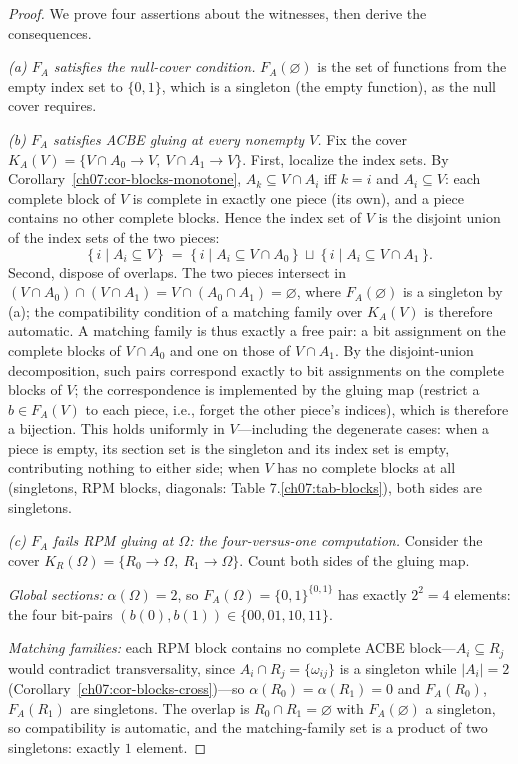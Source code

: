 \begin{proof}
We prove four assertions about the witnesses, then derive the consequences.

\emph{(a) $F_{A}$ satisfies the null-cover condition.} $F_{A}(\varnothing)$ is the set of functions from the empty index set to $\{0,1\}$, which is a singleton (the empty function), as the null cover requires.

\emph{(b) $F_{A}$ satisfies ACBE gluing at every nonempty $V$.} Fix the cover $K_{A}(V)=\{V\cap A_{0}\to V,\ V\cap A_{1}\to V\}$. First, localize the index sets. By Corollary~\ref{ch07:cor-blocks-monotone}, $A_{k}\subseteq V\cap A_{i}$ iff $k=i$ and $A_{i}\subseteq V$: each complete block of $V$ is complete in exactly one piece (its own), and a piece contains no other complete blocks. Hence the index set of $V$ is the disjoint union of the index sets of the two pieces:
\[
\{\,i\mid A_{i}\subseteq V\,\}\;=\;\{\,i\mid A_{i}\subseteq V\cap A_{0}\,\}\ \sqcup\ \{\,i\mid A_{i}\subseteq V\cap A_{1}\,\}.
\]
Second, dispose of overlaps. The two pieces intersect in $(V\cap A_{0})\cap(V\cap A_{1})=V\cap(A_{0}\cap A_{1})=\varnothing$, where $F_{A}(\varnothing)$ is a singleton by (a); the compatibility condition of a matching family over $K_{A}(V)$ is therefore automatic. A matching family is thus exactly a free pair: a bit assignment on the complete blocks of $V\cap A_{0}$ and one on those of $V\cap A_{1}$. By the disjoint-union decomposition, such pairs correspond exactly to bit assignments on the complete blocks of $V$; the correspondence is implemented by the gluing map (restrict a $b\in F_{A}(V)$ to each piece, i.e., forget the other piece's indices), which is therefore a bijection. This holds uniformly in $V$---including the degenerate cases: when a piece is empty, its section set is the singleton and its index set is empty, contributing nothing to either side; when $V$ has no complete blocks at all (singletons, RPM blocks, diagonals: Table 7.\ref{ch07:tab-blocks}), both sides are singletons.

\emph{(c) $F_{A}$ fails RPM gluing at $\Omega$: the four-versus-one computation.} Consider the cover $K_{R}(\Omega)=\{R_{0}\to\Omega,\ R_{1}\to\Omega\}$. Count both sides of the gluing map.

\emph{Global sections:} $\alpha(\Omega)=2$, so $F_{A}(\Omega)=\{0,1\}^{\{0,1\}}$ has exactly $2^{2}=4$ elements: the four bit-pairs $(b(0),b(1))\in\{00,01,10,11\}$.

\emph{Matching families:} each RPM block contains no complete ACBE block---$A_{i}\subseteq R_{j}$ would contradict transversality, since $A_{i}\cap R_{j}=\{\omega_{ij}\}$ is a singleton while $|A_{i}|=2$ (Corollary~\ref{ch07:cor-blocks-cross})---so $\alpha(R_{0})=\alpha(R_{1})=0$ and $F_{A}(R_{0})$, $F_{A}(R_{1})$ are singletons. The overlap is $R_{0}\cap R_{1}=\varnothing$ with $F_{A}(\varnothing)$ a singleton, so compatibility is automatic, and the matching-family set is a product of two singletons: exactly $1$ element.


\end{proof}
